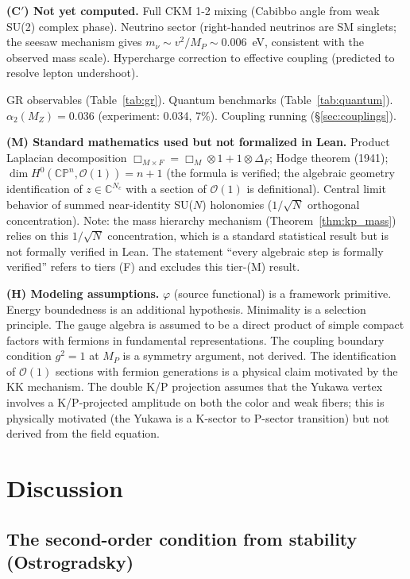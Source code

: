 \documentclass[12pt,a4paper]{article}
\begin{document}
\textbf{(C$'$) Not yet computed.} Full CKM 1-2 mixing (Cabibbo angle from weak SU(2) complex phase). Neutrino sector (right-handed neutrinos are SM singlets; the seesaw mechanism gives $m_\nu \sim v^2/M_P \sim 0.006$~eV, consistent with the observed mass scale). Hypercharge correction to effective coupling (predicted to resolve lepton undershoot).

GR observables (Table~\ref{tab:gr}). Quantum benchmarks (Table~\ref{tab:quantum}). $\alpha_2(M_Z) = 0.036$ (experiment: 0.034, 7\%). Coupling running (\S\ref{sec:couplings}).

\textbf{(M) Standard mathematics used but not formalized in Lean.} Product Laplacian decomposition $\Box_{M \times F} = \Box_M \otimes 1 + 1 \otimes \Delta_F$; Hodge theorem (1941); $\dim H^0(\mathbb{CP}^n, \mathcal{O}(1)) = n+1$ (the formula is verified; the algebraic geometry identification of $z \in \mathbb{C}^{N_c}$ with a section of $\mathcal{O}(1)$ is definitional). Central limit behavior of summed near-identity SU($N$) holonomies ($1/\sqrt{N}$ orthogonal concentration).  Note: the mass hierarchy mechanism (Theorem~\ref{thm:kp_mass}) relies on this $1/\sqrt{N}$ concentration, which is a standard statistical result but is not formally verified in Lean.  The statement ``every algebraic step is formally verified'' refers to tiers (F) and excludes this tier-(M) result.

\textbf{(H) Modeling assumptions.} $\varphi$ (source functional) is a framework primitive. Energy boundedness is an additional hypothesis. Minimality is a selection principle. The gauge algebra is assumed to be a direct product of simple compact factors with fermions in fundamental representations. The coupling boundary condition $g^2 = 1$ at $M_P$ is a symmetry argument, not derived. The identification of $\mathcal{O}(1)$ sections with fermion generations is a physical claim motivated by the KK mechanism. The double K/P projection assumes that the Yukawa vertex involves a K/P-projected amplitude on both the color and weak fibers; this is physically motivated (the Yukawa is a K-sector to P-sector transition) but not derived from the field equation.

\section{Discussion}

\subsection{The second-order condition from stability (Ostrogradsky)}
\label{sec:ostrogradsky}
\end{document}
